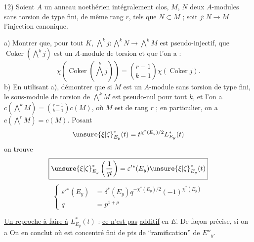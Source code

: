12) Soient $A$ un anneau noethérien intégralement clos, $M$, $N$ deux $A$-modules sans torsion de type fini, de même rang $r$, tels que $N\subset M$ ; soit $j:N\longrightarrow M$ l'injection canonique.

a) Montrer que, pour tout $K$, $\bigwedge^k j:\bigwedge^kN\longrightarrow\bigwedge^kM$ est pseudo-injectif, que $\operatorname{Coker}(\bigwedge^k j)$ est un $A$-module de torsion et que l'on a :
\[
\chi(\operatorname{Coker}(\bigwedge^k j))=\binom{r-1}{k-1}\chi(\operatorname{Coker}j).
\]
b) En utilisant a), démontrer que si $M$ est un $A$-module sans torsion de type fini, le sous-module de torsion de $\bigwedge^kM$ est pseudo-nul pour tout $k$, et l'on a $c(\bigwedge^kM)=\binom{r-1}{k-1}c(M)$, où $M$ est de rang $r$ ; en particulier, on a $c(\bigwedge^rM)=c(M)$.
Posant
\[
\unsure{\xi|\zeta}^*_{E_y}(t)=t^{\chi^*(E_y)/2}L^*_{E_y}(t)
\]
on trouve
\[
\boxed{\unsure{\xi|\zeta}^*_{E_y}\left(\frac1{qt}\right)=\varepsilon'{}^*(E_y)\unsure{\xi|\zeta}^*_{E_y}(t)}
\]
\[
\left\{\begin{aligned}
\varepsilon'{}^*(E_y)&=\delta^*(E_y)q^{-\chi^*(E_y)/2}(-1)^{\chi^*(E_y)}\\
q&=p^{1+\rho}
\end{aligned}\right.
\]

\uline{Un reproche à faire à} $L^*_{E_y}(t)$ : \uline{ce n'est pas} \uline{additif} en $E$. De façon précise, si on a
On en conclut
où
est concentré   fini de pts de ``ramification'' de $E''_y$.

